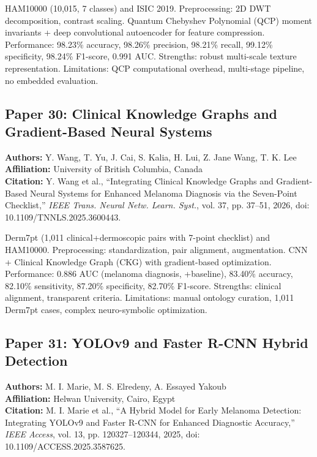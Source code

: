 \documentclass[conference]{IEEEtran}
\begin{document}
HAM10000 (10,015, 7 classes) and ISIC 2019. Preprocessing: 2D DWT decomposition, contrast scaling. Quantum Chebyshev Polynomial (QCP) moment invariants + deep convolutional autoencoder for feature compression. Performance: 98.23\% accuracy, 98.26\% precision, 98.21\% recall, 99.12\% specificity, 98.24\% F1-score, 0.991 AUC. Strengths: robust multi-scale texture representation. Limitations: QCP computational overhead, multi-stage pipeline, no embedded evaluation.

\subsection{Paper 30: Clinical Knowledge Graphs and Gradient-Based Neural Systems}

\noindent\textbf{Authors:} Y. Wang, T. Yu, J. Cai, S. Kalia, H. Lui, Z. Jane Wang, T. K. Lee\\
\textbf{Affiliation:} University of British Columbia, Canada\\
\textbf{Citation:} Y. Wang et al., ``Integrating Clinical Knowledge Graphs and Gradient-Based Neural Systems for Enhanced Melanoma Diagnosis via the Seven-Point Checklist,'' \textit{IEEE Trans. Neural Netw. Learn. Syst.}, vol. 37, pp. 37--51, 2026, doi: 10.1109/TNNLS.2025.3600443.

Derm7pt (1,011 clinical+dermoscopic pairs with 7-point checklist) and HAM10000. Preprocessing: standardization, pair alignment, augmentation. CNN + Clinical Knowledge Graph (CKG) with gradient-based optimization. Performance: 0.886 AUC (melanoma diagnosis, +baseline), 83.40\% accuracy, 82.10\% sensitivity, 87.20\% specificity, 82.70\% F1-score. Strengths: clinical alignment, transparent criteria. Limitations: manual ontology curation, 1,011 Derm7pt cases, complex neuro-symbolic optimization.

\subsection{Paper 31: YOLOv9 and Faster R-CNN Hybrid Detection}

\noindent\textbf{Authors:} M. I. Marie, M. S. Elredeny, A. Essayed Yakoub\\
\textbf{Affiliation:} Helwan University, Cairo, Egypt\\
\textbf{Citation:} M. I. Marie et al., ``A Hybrid Model for Early Melanoma Detection: Integrating YOLOv9 and Faster R-CNN for Enhanced Diagnostic Accuracy,'' \textit{IEEE Access}, vol. 13, pp. 120327--120344, 2025, doi: 10.1109/ACCESS.2025.3587625.
\end{document}
